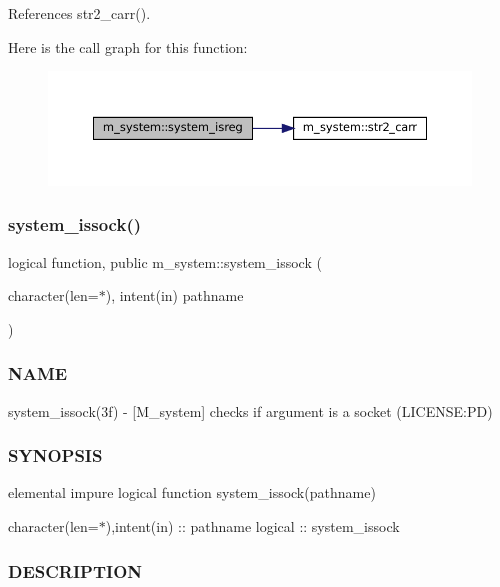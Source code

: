 References str2\+\_\+carr().

Here is the call graph for this function\+:\nopagebreak
\begin{figure}[H]
\begin{center}
\leavevmode
\includegraphics[width=350pt]{namespacem__system_a8ea0d0430227af61b8083b4e7d6e597d_cgraph}
\end{center}
\end{figure}
\mbox{\label{namespacem__system_af6eb5074fe74552bc7a5e7d00f459087}} 
\subsubsection{\texorpdfstring{system\+\_\+issock()}{system\_issock()}}
{\footnotesize\ttfamily logical function, public m\+\_\+system\+::system\+\_\+issock (\begin{DoxyParamCaption}\item[{character(len=$\ast$), intent(in)}]{pathname }\end{DoxyParamCaption})}



\subsubsection*{N\+A\+ME}

system\+\_\+issock(3f) -\/ \mbox{[}M\+\_\+system\mbox{]} checks if argument is a socket (L\+I\+C\+E\+N\+SE\+:PD) 

\subsubsection*{S\+Y\+N\+O\+P\+S\+IS}

elemental impure logical function system\+\_\+issock(pathname)

character(len=$\ast$),intent(in) \+:\+: pathname logical \+:\+: system\+\_\+issock

\subsubsection*{D\+E\+S\+C\+R\+I\+P\+T\+I\+ON}

